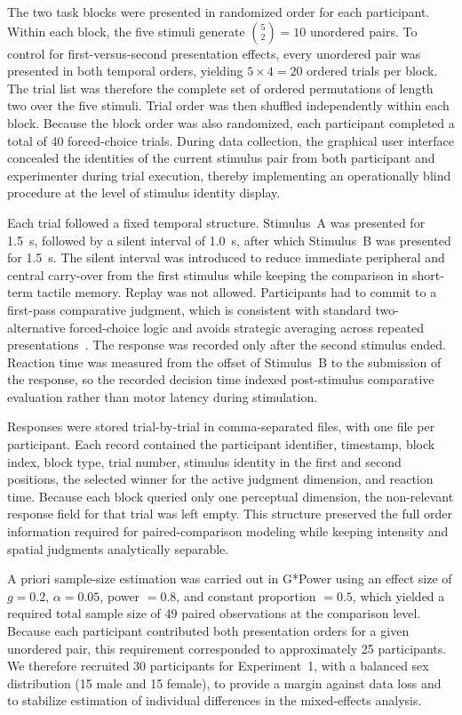 \documentclass[pdflatex, sn-nature]{sn-jnl}
\theoremstyle{thmstyleone}%
\theoremstyle{thmstyletwo}%
\theoremstyle{thmstylethree}%
\begin{document}
The two task blocks were presented in randomized order for each participant. Within each block, the five stimuli generate $\binom{5}{2}=10$ unordered pairs. To control for first-versus-second presentation effects, every unordered pair was presented in both temporal orders, yielding $5\times4=20$ ordered trials per block. The trial list was therefore the complete set of ordered permutations of length two over the five stimuli. Trial order was then shuffled independently within each block. Because the block order was also randomized, each participant completed a total of 40 forced-choice trials. During data collection, the graphical user interface concealed the identities of the current stimulus pair from both participant and experimenter during trial execution, thereby implementing an operationally blind procedure at the level of stimulus identity display.

Each trial followed a fixed temporal structure. Stimulus~A was presented for \qty{1.5}{\second}, followed by a silent interval of \qty{1.0}{\second}, after which Stimulus~B was presented for \qty{1.5}{\second}. The silent interval was introduced to reduce immediate peripheral and central carry-over from the first stimulus while keeping the comparison in short-term tactile memory. Replay was not allowed. Participants had to commit to a first-pass comparative judgment, which is consistent with standard two-alternative forced-choice logic and avoids strategic averaging across repeated presentations~\citep{bradleyRankAnalysisIncomplete1952}. The response was recorded only after the second stimulus ended. Reaction time was measured from the offset of Stimulus~B to the submission of the response, so the recorded decision time indexed post-stimulus comparative evaluation rather than motor latency during stimulation.

Responses were stored trial-by-trial in comma-separated files, with one file per participant. Each record contained the participant identifier, timestamp, block index, block type, trial number, stimulus identity in the first and second positions, the selected winner for the active judgment dimension, and reaction time. Because each block queried only one perceptual dimension, the non-relevant response field for that trial was left empty. This structure preserved the full order information required for paired-comparison modeling while keeping intensity and spatial judgments analytically separable.

A priori sample-size estimation was carried out in G*Power using an effect size of $g=0.2$, $\alpha=0.05$, power $=0.8$, and constant proportion $=0.5$, which yielded a required total sample size of 49 paired observations at the comparison level. Because each participant contributed both presentation orders for a given unordered pair, this requirement corresponded to approximately 25 participants. We therefore recruited 30 participants for Experiment~1, with a balanced sex distribution (15 male and 15 female), to provide a margin against data loss and to stabilize estimation of individual differences in the mixed-effects analysis.
\end{document}

